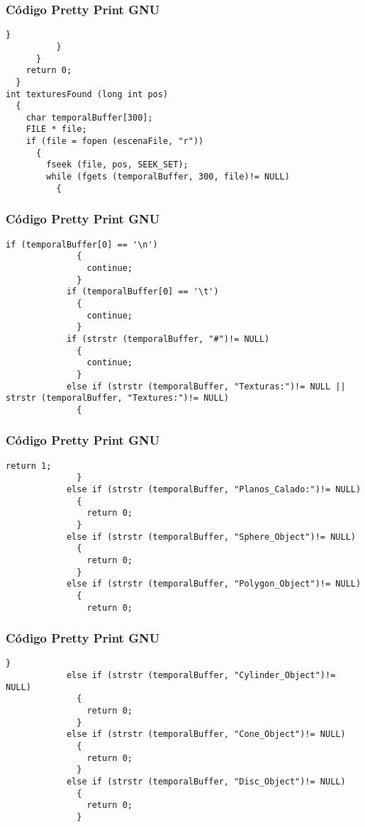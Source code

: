 \documentclass{beamer}
\begin{document}
\begin{frame}[fragile]
\frametitle{C\'odigo Pretty Print GNU}
\begin{lstlisting}[style=CStyle]
              }
          }
      }
    return 0;
  }
int texturesFound (long int pos)
  {
    char temporalBuffer[300];
    FILE * file;
    if (file = fopen (escenaFile, "r"))
      {
        fseek (file, pos, SEEK_SET);
        while (fgets (temporalBuffer, 300, file)!= NULL)
          {
            \end{lstlisting}
\end{frame}
\begin{frame}[fragile]
\frametitle{C\'odigo Pretty Print GNU}
\begin{lstlisting}[style=CStyle]
            if (temporalBuffer[0] == '\n')
              {
                continue;
              }
            if (temporalBuffer[0] == '\t')
              {
                continue;
              }
            if (strstr (temporalBuffer, "#")!= NULL)
              {
                continue;
              }
            else if (strstr (temporalBuffer, "Texturas:")!= NULL || strstr (temporalBuffer, "Textures:")!= NULL)
              {
                \end{lstlisting}
\end{frame}
\begin{frame}[fragile]
\frametitle{C\'odigo Pretty Print GNU}
\begin{lstlisting}[style=CStyle]
                return 1;
              }
            else if (strstr (temporalBuffer, "Planos_Calado:")!= NULL)
              {
                return 0;
              }
            else if (strstr (temporalBuffer, "Sphere_Object")!= NULL)
              {
                return 0;
              }
            else if (strstr (temporalBuffer, "Polygon_Object")!= NULL)
              {
                return 0;
\end{lstlisting}
\end{frame}
\begin{frame}[fragile]
\frametitle{C\'odigo Pretty Print GNU}
\begin{lstlisting}[style=CStyle]
              }
            else if (strstr (temporalBuffer, "Cylinder_Object")!= NULL)
              {
                return 0;
              }
            else if (strstr (temporalBuffer, "Cone_Object")!= NULL)
              {
                return 0;
              }
            else if (strstr (temporalBuffer, "Disc_Object")!= NULL)
              {
                return 0;
              }
\end{lstlisting}
\end{frame}
\end{document}
